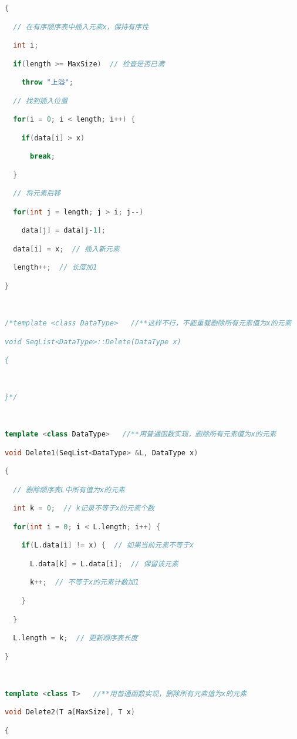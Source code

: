 \begin{lstlisting}[language=C++]
{  

  // 在有序顺序表中插入元素x，保持有序性

  int i;

  if(length >= MaxSize)  // 检查是否已满

    throw "上溢";

  // 找到插入位置

  for(i = 0; i < length; i++) {

    if(data[i] > x)

      break;

  }

  // 将元素后移

  for(int j = length; j > i; j--)

    data[j] = data[j-1];

  data[i] = x;  // 插入新元素

  length++;  // 长度加1

}

  

/*template <class DataType>   //**这样不行，不能重载删除所有元素值为x的元素  

void SeqList<DataType>::Delete(DataType x)

{  

  

}*/

  

template <class DataType>   //**用普通函数实现，删除所有元素值为x的元素

void Delete1(SeqList<DataType> &L, DataType x)

{

  // 删除顺序表L中所有值为x的元素

  int k = 0;  // k记录不等于x的元素个数

  for(int i = 0; i < L.length; i++) {

    if(L.data[i] != x) {  // 如果当前元素不等于x

      L.data[k] = L.data[i];  // 保留该元素

      k++;  // 不等于x的元素计数加1

    }

  }

  L.length = k;  // 更新顺序表长度

}

  

template <class T>   //**用普通函数实现，删除所有元素值为x的元素

void Delete2(T a[MaxSize], T x)  

{


\end{lstlisting}
